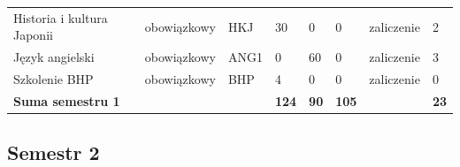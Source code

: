 \documentclass[12pt,a4paper]{article}
\begin{document}
{\begin{longtable}{m{5.0cm}m{1.9cm}m{0.75cm}m{0.85cm}m{0.85cm}m{0.85cm}m{1.45cm}m{0.9cm}}
\rowcolor{tableRowLight} Historia i kultura Japonii & {\scriptsize obowiązkowy} & HKJ & 30 & 0 & 0 & {\scriptsize zaliczenie} & 2 \\
\rowcolor{tableRowAlt} Język angielski & {\scriptsize obowiązkowy} & ANG1 & 0 & 60 & 0 & {\scriptsize zaliczenie} & 3 \\
\rowcolor{tableRowLight} Szkolenie BHP & {\scriptsize obowiązkowy} & BHP & 4 & 0 & 0 & {\scriptsize zaliczenie} & 0 \\
\midrule[\heavyrulewidth]
\rowcolor{tableSummary} \textbf{Suma semestru 1} & & & \textbf{124} & \textbf{90} & \textbf{105} & & \textbf{23} \\
\bottomrule
\end{longtable}}

\subsection*{Semestr 2}
\end{document}
